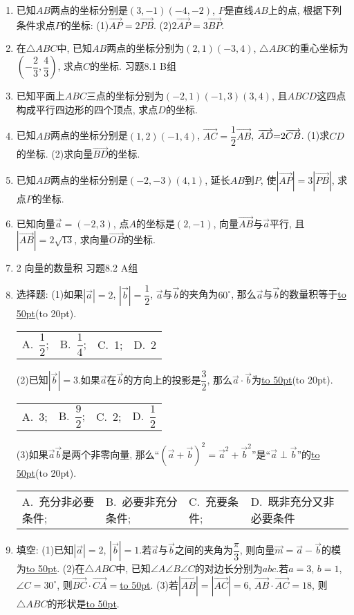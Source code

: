 \documentclass[10pt,a4paper]{article}
\newcommand{\blank}[1]{\underline{\hbox to #1pt{}}}
\newcommand{\bracket}[1]{(\hbox to #1pt{})}
\newcommand{\fourch}[4]{\par\begin{tabular}{p{.23\textwidth}p{.23\textwidth}p{.23\textwidth}p{.23\textwidth}}
A.~#1 &B.~#2& C.~#3& D.~#4
\end{tabular}}
\begin{document}
\begin{enumerate}[1.]
\item 已知$AB$两点的坐标分别是$(3,-1)(-4,-2)$, $P$是直线$AB$上的点, 根据下列条件求点$P$的坐标:
(1)$\overrightarrow {AP}=2\overrightarrow {PB}$.							(2)$2\overrightarrow {AP}=3\overrightarrow {BP}$.
\item 在$\triangle ABC$中, 已知$AB$两点的坐标分别为$(2,1)(-3,4)$, $\triangle ABC$的重心坐标为$(-\dfrac 23,\dfrac 43)$, 求点$C$的坐标.
习题8.1  B组
\item 已知平面上$ABC$三点的坐标分别为$(-2,1)(-1,3)(3,4)$, 且$ABCD$这四点构成平行四边形的四个顶点, 求点$D$的坐标.
\item 已知$AB$两点的坐标分别是$(1,2)(-1,4)$, $\overrightarrow {AC}=\dfrac 12\overrightarrow {AB}$, $\overrightarrow {AD}\text=2\overrightarrow {CB}$.
(1)求$CD$的坐标.
(2)求向量$\overrightarrow {BD}$的坐标.
\item 已知$AB$两点的坐标分别是$(-2,-3)(4,1)$, 延长$AB$到$P$, 使$|\overrightarrow {AP}|=3|\overrightarrow {PB}|$, 求点$P$的坐标.
\item 已知向量$\overrightarrow a=(-2,3)$, 点$A$的坐标是$(2,-1)$, 向量$\overrightarrow {AB}$与$\overrightarrow a$平行, 且$|\overrightarrow {AB}|=2\sqrt {13}$, 求向量$\overrightarrow {OB}$的坐标.
\item 2  向量的数量积
习题8.2  A组
\item 选择题:
(1)如果$|\overrightarrow a|=2$, $|\overrightarrow b|=\dfrac 12$, $\overrightarrow a$与$\overrightarrow b$的夹角为$60^{\circ }$, 那么$\overrightarrow a$与$\overrightarrow b$的数量积等于\blank{50}\bracket{20}.
\fourch{$\dfrac 12$;}{$\dfrac 14$;}{1;}{2}
(2)已知$|\overrightarrow b|=3$.如果$\overrightarrow a$在$\overrightarrow b$的方向上的投影是$\dfrac 32$, 那么$\overrightarrow a\cdot \overrightarrow b$为\blank{50}\bracket{20}.
\fourch{3;}{$\dfrac 92$;}{2;}{$\dfrac 12$}
(3)如果$\overrightarrow a\overrightarrow b$是两个非零向量, 那么``$(\overrightarrow a+\overrightarrow b)^2=\overrightarrow a^2+\overrightarrow b^2$''是``$\overrightarrow a\perp \overrightarrow b$''的\blank{50}\bracket{20}.
\fourch{充分非必要条件;}{必要非充分条件;}{充要条件;}{既非充分又非必要条件}
\item 填空:
(1)已知$|\overrightarrow a|=2$, $|\overrightarrow b|=1$.若$\overrightarrow a$与$\overrightarrow b$之间的夹角为$\dfrac{\pi }3$, 则向量$\overrightarrow m=\overrightarrow a-\overrightarrow b$的模为\blank{50}.
(2)在$\triangle ABC$中, 已知$\angle A\angle B\angle C$的对边长分别为$abc$.若$a=3$, $b=1$, $\angle C=30^{\circ }$, 则$\overrightarrow {BC}\cdot \overrightarrow {CA}=$\blank{50}.
(3)若$|\overrightarrow {AB}|=|\overrightarrow {AC}|=6$, $\overrightarrow {AB}\cdot \overrightarrow {AC}=18$, 则$\triangle ABC$的形状是\blank{50}.

\end{enumerate}
\end{document}
